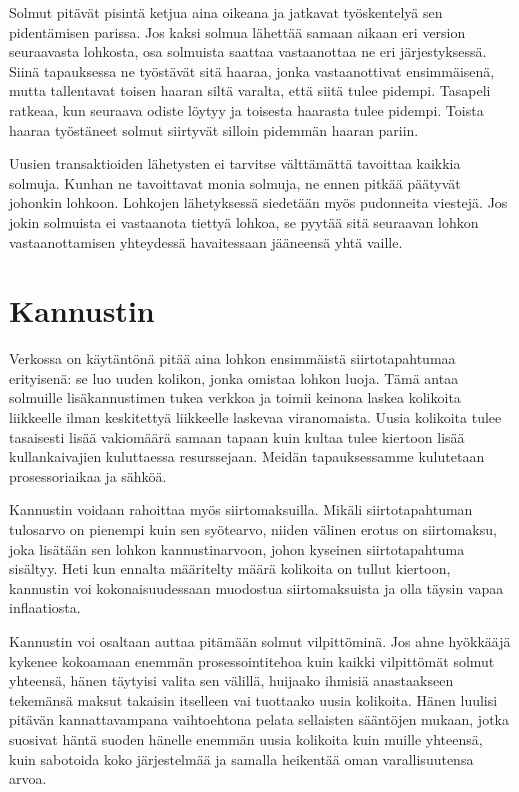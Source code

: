 \documentclass{article}
\begin{document}
Solmut pitävät pisintä ketjua aina oikeana ja jatkavat työskentelyä sen pidentämisen parissa. Jos kaksi solmua lähettää samaan aikaan eri version seuraavasta lohkosta, osa solmuista saattaa vastaanottaa ne eri järjestyksessä. Siinä tapauksessa ne työstävät sitä haaraa, jonka vastaanottivat ensimmäisenä, mutta tallentavat toisen haaran siltä varalta, että siitä tulee pidempi. Tasapeli ratkeaa, kun seuraava odiste löytyy ja toisesta haarasta tulee pidempi. Toista haaraa työstäneet solmut siirtyvät silloin pidemmän haaran pariin.

Uusien transaktioiden lähetysten ei tarvitse välttämättä tavoittaa kaikkia solmuja. Kunhan ne tavoittavat monia solmuja, ne ennen pitkää päätyvät johonkin lohkoon. Lohkojen lähetyksessä siedetään myös pudonneita viestejä. Jos jokin solmuista ei vastaanota tiettyä lohkoa, se pyytää sitä seuraavan lohkon vastaanottamisen yhteydessä havaitessaan jääneensä yhtä vaille.


\section{Kannustin}

Verkossa on käytäntönä pitää aina lohkon ensimmäistä siirtotapahtumaa erityisenä: se luo uuden kolikon, jonka omistaa lohkon luoja. Tämä antaa solmuille lisäkannustimen tukea verkkoa ja toimii keinona laskea kolikoita liikkeelle ilman keskitettyä liikkeelle laskevaa viranomaista. Uusia kolikoita tulee tasaisesti lisää vakiomäärä samaan tapaan kuin kultaa tulee kiertoon lisää kullankaivajien kuluttaessa resurssejaan. Meidän tapauksessamme kulutetaan prosessoriaikaa ja sähköä.

Kannustin voidaan rahoittaa myös siirtomaksuilla. Mikäli siirtotapahtuman tulosarvo on pienempi kuin sen syötearvo, niiden välinen erotus on siirtomaksu, joka lisätään sen lohkon kannustinarvoon, johon kyseinen siirtotapahtuma sisältyy. Heti kun ennalta määritelty määrä kolikoita on tullut kiertoon, kannustin voi kokonaisuudessaan muodostua siirtomaksuista ja olla täysin vapaa inflaatiosta.

Kannustin voi osaltaan auttaa pitämään solmut vilpittöminä. Jos ahne hyök\-kää\-jä  kykenee kokoamaan enemmän prosessointitehoa kuin kaikki vilpittömät solmut yhteensä, hänen täytyisi valita sen välillä, huijaako ihmisiä anastaakseen tekemänsä maksut takaisin itselleen vai tuottaako uusia kolikoita. Hänen luulisi pitävän kannattavampana vaihtoehtona pelata sellaisten sääntöjen mukaan, jotka suosivat häntä suoden hänelle enemmän uusia kolikoita kuin muille yhteensä, kuin sabotoida koko järjestelmää ja samalla heikentää oman varallisuutensa arvoa.
\end{document}
